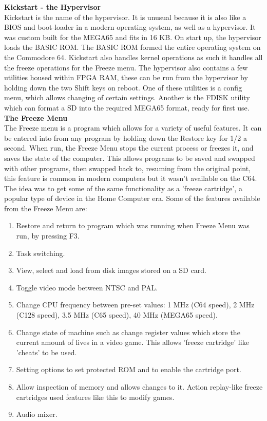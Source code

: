 \textbf{Kickstart - the Hypervisor}\\
Kickstart is the name of the hypervisor. It is unusual because it is also like a BIOS and boot-loader in a modern operating system, as well as a hypervisor. It was custom built for the MEGA65 and fits in 16 KB. On start up, the hypervisor loads the BASIC ROM. The BASIC ROM formed the entire operating system on the Commodore 64. Kickstart also handles kernel operations as such it handles all the freeze operations for the Freeze menu. The hypervisor also contains a few utilities housed within FPGA RAM, these can be run from the hypervisor by holding down the two Shift keys on reboot. One of these utilities is a config menu, which allows changing of certain settings. Another is the FDISK utility which can format a SD into the required MEGA65 format, ready for first use.\\

\textbf{The Freeze Menu}\\
The Freeze menu is a program which allows for a variety of useful features. It can be entered into from any program by holding down the Restore key for 1/2 a second. When run, the Freeze Menu stops the current process or freezes it, and saves the state of the computer. This allows programs to be saved and swapped with other programs, then swapped back to, resuming from the original point, this feature is common in modern computers but it wasn't available on the C64. The idea was to get some of the same functionality as a 'freeze cartridge', a popular type of device in the Home Computer era. Some of the features available from the Freeze Menu are:
\begin{enumerate}
\item Restore and return to program which was running when Freeze Menu was run, by pressing F3.
\item Task switching.
\item View, select and load from disk images stored on a SD card.
\item Toggle video mode between NTSC and PAL.
\item Change CPU frequency between pre-set values: 1 MHz (C64 speed), 2 MHz (C128 speed), 3.5 MHz (C65 speed), 40 MHz (MEGA65 speed).
\item Change state of machine such as change register values which store the current amount of lives in a video game. This allows 'freeze cartridge' like 'cheats' to be used.
\item Setting options to set protected ROM and to enable the cartridge port.
\item Allow inspection of memory and allows changes to it. Action replay-like freeze cartridges used features like this to modify games.
\item Audio mixer.
\end{enumerate}


